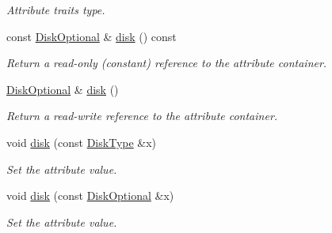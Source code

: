 \begin{DoxyCompactItemize}
\begin{DoxyCompactList}\small\item\em Attribute traits type. \item\end{DoxyCompactList}\item 
const \hyperlink{classopenstack_1_1xml_1_1Flavor_aed467d68d571ae2a8e021bbd79f348b6}{DiskOptional} \& \hyperlink{classopenstack_1_1xml_1_1Flavor_abd59575335a7e014fd43fe4a66275b3b}{disk} () const 
\begin{DoxyCompactList}\small\item\em Return a read-\/only (constant) reference to the attribute container. \item\end{DoxyCompactList}\item 
\hyperlink{classopenstack_1_1xml_1_1Flavor_aed467d68d571ae2a8e021bbd79f348b6}{DiskOptional} \& \hyperlink{classopenstack_1_1xml_1_1Flavor_a9c78bd3b0c933abb79453d6e508a2a4e}{disk} ()
\begin{DoxyCompactList}\small\item\em Return a read-\/write reference to the attribute container. \item\end{DoxyCompactList}\item 
void \hyperlink{classopenstack_1_1xml_1_1Flavor_a31ebc8dcff9f30cdb9a9aee6f69cd521}{disk} (const \hyperlink{classopenstack_1_1xml_1_1Flavor_aa9b8ffd8f2894beccac051ea147216ea}{DiskType} \&x)
\begin{DoxyCompactList}\small\item\em Set the attribute value. \item\end{DoxyCompactList}\item 
void \hyperlink{classopenstack_1_1xml_1_1Flavor_acb770ae9986b06a9d6e536a817eb22cb}{disk} (const \hyperlink{classopenstack_1_1xml_1_1Flavor_aed467d68d571ae2a8e021bbd79f348b6}{DiskOptional} \&x)
\begin{DoxyCompactList}\small\item\em Set the attribute value. \item\end{DoxyCompactList}\end{DoxyCompactItemize}
